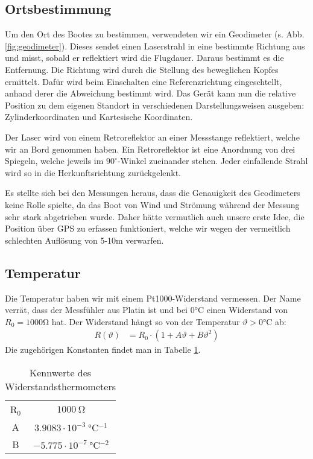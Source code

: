 \documentclass[12pt,a4paper,titlepage,headinclude,bibtotoc]{scrartcl}
\begin{document}
\subsection{Ortsbestimmung}
Um den Ort des Bootes zu bestimmen, verwendeten wir ein Geodimeter (s. Abb. \ref{fig:geodimeter}).
Dieses sendet einen Laserstrahl in eine bestimmte Richtung aus und misst, sobald er reflektiert wird die Flugdauer.
Daraus bestimmt es die Entfernung.
Die Richtung wird durch die Stellung des beweglichen Kopfes ermittelt.
Dafür wird beim Einschalten eine Referenzrichtung eingeschtellt, anhand derer die Abweichung bestimmt wird.
Das Gerät kann nun die relative Position zu dem eigenen Standort in verschiedenen Darstellungsweisen ausgeben: Zylinderkoordinaten und Kartesische Koordinaten.

Der Laser wird von einem Retroreflektor an einer Messstange reflektiert, welche wir an Bord genommen haben.
Ein Retroreflektor ist eine Anordnung von drei Spiegeln, welche jeweils im $90^\circ$-Winkel zueinander stehen.
Jeder einfallende Strahl wird so in die Herkunftsrichtung zurückgelenkt.

Es stellte sich bei den Messungen heraus, dass die Genauigkeit des Geodimeters keine Rolle spielte, da das Boot von Wind und Strömung während der Messung sehr stark abgetrieben wurde.
Daher hätte vermutlich auch unsere erste Idee, die Position über GPS zu erfassen funktioniert, welche wir wegen der vermeitlich schlechten Auflösung von 5-10m verwarfen.

\subsection{Temperatur}
Die Temperatur haben wir mit einem Pt1000-Widerstand vermessen.
Der Name verrät, dass der Messfühler aus Platin ist und bei $0\si{\celsius}$ einen Widerstand von $R_0=1000\si{\ohm}$ hat.
Der Widerstand hängt so von der Temperatur $\vartheta>0\si{\celsius}$ ab:
\begin{align}
	R(\vartheta)&=R_0\cdot\left(1 + A\vartheta + B\vartheta^2\right) \label{eq:Pt1000}
\end{align}
Die zugehörigen Konstanten findet man in Tabelle \ref{tab:Pt1000}.

\begin{table}[!htb]
	\centering
	\begin{tabular}{|c|c|}
		\hline
		R$_0$ & $1000 ~ \si{\ohm}$\\
		A   & $3.9083 \cdot 10^{-3} ~ \si{\celsius^{-1}}$\\
		B   & $-5.775 \cdot 10^{-7} ~ \si{\celsius^{-2}}$\\
		\hline
	\end{tabular}
	\caption{Kennwerte des Widerstandsthermometers}
	\label{tab:Pt1000}
\end{table}
\end{document}

